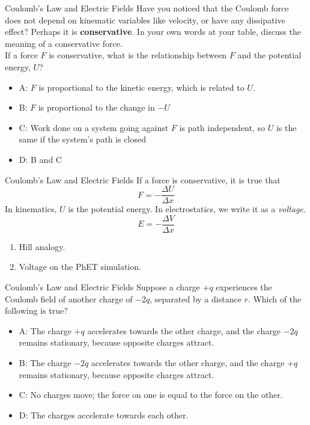 \documentclass{beamer}
\begin{document}
\begin{frame}{Coulomb’s Law and Electric Fields}
Have you noticed that the Coulomb force does not depend on kinematic variables like velocity, or have any dissipative effect?  Perhaps it is \alert{\textbf{conservative}}.  In your own words at your table, discuss the meaning of a conservative force. \\ \vspace{0.5cm}
\small
If a force $F$ is conservative, what is the relationship between $F$ and the potential energy, $U$?
\begin{itemize}
\item A: $F$ is proportional to the kinetic energy, which is related to $U$.
\item B: $F$ is proportional to the change in $-U$
\item C: Work done on a system going against $F$ is path independent, so $U$ is the same if the system's path is closed
\item D: B and C
\end{itemize}
\end{frame}

\begin{frame}{Coulomb’s Law and Electric Fields}
If a force is conservative, it is true that
\begin{equation}
F = -\frac{\Delta U}{\Delta x}
\end{equation}
In kinematics, $U$ is the potential energy.  In electrostatics, we write it as a \textit{voltage.}
\begin{equation}
E = -\frac{\Delta V}{\Delta x}
\end{equation}
\begin{enumerate}
\item Hill analogy.
\item Voltage on the PhET simulation.
\end{enumerate}
\end{frame}

\begin{frame}{Coulomb’s Law and Electric Fields}
Suppose a charge $+q$ experiences the Coulomb field of another charge of $-2q$, separated by a distance $r$.  Which of the following is true?
\begin{itemize}
\item A: The charge $+q$ accelerates towards the other charge, and the charge $-2q$ remains stationary, because opposite charges attract.
\item B: The charge $-2q$ accelerates towards the other charge, and the charge $+q$ remains stationary, because opposite charges attract.
\item C: No charges move; the force on one is equal to the force on the other.
\item D: The charges accelerate towards each other.
\end{itemize}
\end{frame}
\end{document}
